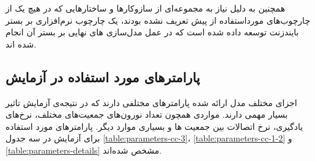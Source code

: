 \documentclass[12pt]{report}
\begin{document}
	همچنین به دلیل نیاز به مجموعه‌ای از سازوکار‌ها و ساختارهایی که در هیچ یک از چارچوب‌های مورد‌استفاده از پیش تعریف نشده بودند، یک چارچوب نرم‌افزاری بر بستر بایندزنت توسعه داده شده است که در عمل مدل‌سازی های نهایی بر بستر آن انجام شده اند.
	
	\subsection{پارامتر‌های مورد استفاده در آزمایش}
	اجزای مختلف مدل ارائه شده پارامتر‌های مختلفی دارند که در نتیجه‌ی آزمایش تاثیر بسیار مهمی دارند. مواردی همچون تعداد نورون‌های جمعیت‌های مختلف، نرخ‌های یادگیری، نرخ اتصالات بین جمعیت ها و بسیاری موارد دیگر. پارامتر‌های مورد استفاده برای آزمایش در سه جدول \ref{table:parameters-cc-3}، \ref{table:parameters-cc-1-2} و \ref{table:parameters-details} مشخص شده‌اند.
\end{document}
